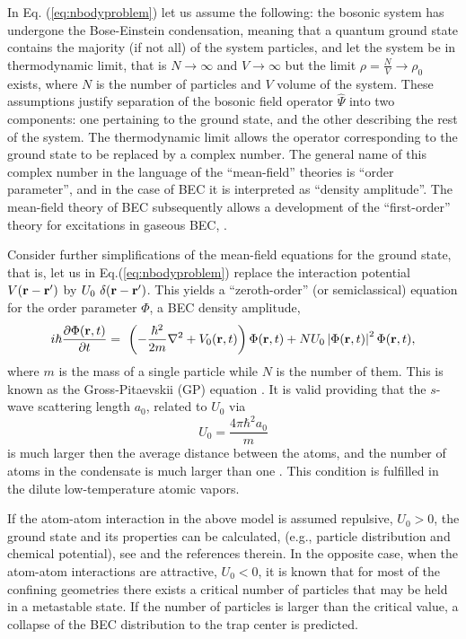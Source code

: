 \documentclass[%
   final       %
]{prospectus}
\begin{document}
\noindent In Eq. (\ref{eq:nbodyproblem}) let us assume the following: the
bosonic system has undergone the Bose-Einstein condensation,
meaning that a quantum ground state contains the majority (if not all) of the 
system particles, and let the system be in thermodynamic limit, that is 
$N \rightarrow \infty$ and $V \rightarrow \infty$ but the limit
$\rho = \frac N V \rightarrow \rho_0$ exists, where $N$ is the number of 
particles and $V$ volume of the system.
These assumptions justify separation of the bosonic field operator
$\hat \Psi$ into two components: one pertaining to
the ground state, and the other describing the rest of the system.
The thermodynamic limit allows the operator corresponding to the ground state
to be replaced by a complex number. The general name of this complex number in
the language of the ``mean-field'' theories is ``order parameter'', and in
the case of BEC it is interpreted as ``density amplitude''.
The mean-field theory of BEC subsequently allows a development of the
``first-order'' theory for excitations in gaseous BEC,
\cite{Abrikosovetal1963}.

Consider further simplifications of the mean-field equations for the ground
state, that is, let us in Eq.(\ref{eq:nbodyproblem}) replace the
interaction potential 
$V({\bf r} - {\bf r'})$ 
by 
$U_0 \ \delta({\bf r} - {\bf r'})$. This yields a
 ``zeroth-order'' (or semiclassical) equation for the order parameter
$\Phi$, a BEC density amplitude, 
\begin{equation}
  \label{eq:gpe}
  i \hbar \frac {\partial \Phi( {\bf r}, t)}{\partial t} = \
  \left( - \frac {\hbar^2} {2 m} \nabla^2 + V_{0}({\bf r},t) \right)
  \Phi( {\bf r}, t) + 
  N U_0 \left| \Phi ({\bf r},t) \right|^2 \Phi( {\bf r}, t),
\end{equation}
where $m$ is the mass of a single particle while $N$ is the number of them.
This is known as the Gross-Pitaevskii (GP) equation
\cite{Gross1961,Pitaevskii1961,Gross1963}. It is valid
providing that the $s$-wave scattering length $a_0$, related to $U_0$ via
\begin{equation}
  \label{eq:1s}
  U_0 = \frac {4 \pi \hbar^2 a_0} {m}
\end{equation}
is much larger then the average distance between the atoms, and the
number of atoms in the condensate is
much larger than one \cite{Abrikosovetal1963,LifshitzPitaevskii1980}.
This condition is fulfilled in the dilute low-temperature atomic vapors.

If the atom-atom interaction in the above model is assumed repulsive,
$U_0 > 0$, the ground state and its properties can be calculated, 
(e.g., particle distribution and chemical potential),
see \cite{ParkinsandWalls1998} and the references therein.
In the opposite case, when the atom-atom interactions are attractive, 
$U_0 < 0$, 
it is known that for most of the confining geometries there exists a critical
number of particles that may be held in a metastable state. If the number
of particles is larger than the critical value, a collapse of the BEC
distribution to the trap center is predicted.
\end{document}

